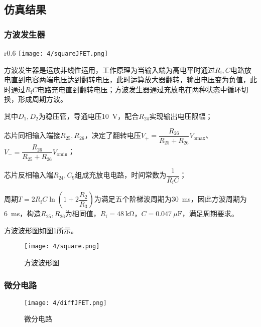 \subsection{仿真结果}%
\label{sub:\arabic{chapter}仿真结果}

\subsubsection{方波发生器}%
\label{ssub:方波发生器}

\begin{wrapfigure}{r}{0.6\linewidth}
	\centering
	\texttt{[image: 4/squareJFET.png]}
	\caption{方波发生器}
	\label{fig:方波发生器}
\end{wrapfigure}

方波发生器是运放非线性运用，工作原理为当输入端为高电平时通过$ R_\mathrm{f}, C $电路放电直到电容两端电压达到翻转电压，此时运算放大器翻转，输出电压变为负值，此时通过$ R_\mathrm{f}C $电路充电直到翻转电压；方波发生器通过充放电在两种状态中循环切换，形成周期方波。

其中$ D_{1},D_{2} $为稳压管，导通电压\SI{10}{\V}，配合$ R_{24} $实现输出电压限幅；

芯片同相输入端接$ R_{25}, R_{26} $，决定了翻转电压$ V_+ = \dfrac{R_{26}}{R_{25}+R_{26}}V_\mathrm{omax} $、$ V_- = \dfrac{R_{26}}{R_{25}+R_{26}}V_\mathrm{omin} $；

芯片反相输入端$ R_{24}, C_9 $组成充放电电路，时间常数为$ \dfrac{1}{R_\mathrm{f}C} $；

周期$ T = 2R_\mathrm{f}C\ln(1 + 2\dfrac{R_2}{R_3}) $为满足五个阶梯波周期为\SI{30}{\ms}，因此方波周期为\SI{6}{\ms}，构造$ R_{25}, R_{26} $为相同值，$ R_\mathrm{f} = \SI{48}{\kohm} $，$ C = \SI{0.047}{\mu\F} $，满足周期要求。

方波波形图如图\ref{fig:方波波形图}所示。

\begin{figure}[H]
	\centering
	\texttt{[image: 4/square.png]}
	\caption{方波波形图}
	\label{fig:方波波形图}
\end{figure}

\newpage

\subsubsection{微分电路}%
\label{ssub:微分电路}

\begin{figure}[H]
	\centering
	\texttt{[image: 4/diffJFET.png]}
	\caption{微分电路}
	\label{fig:微分电路}
\end{figure}


